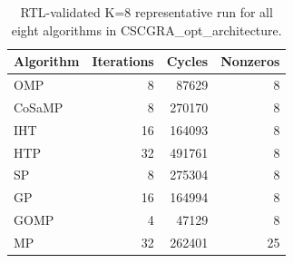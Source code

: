 \begin{table}[t]
\centering
\caption{RTL-validated K=8 representative run for all eight algorithms in CSCGRA\_opt\_architecture.}
\label{tab:k8_8alg_rtl_exact}
\begin{tabular}{lrrr}
\hline
Algorithm & Iterations & Cycles & Nonzeros \\ 
\hline
OMP & 8 & 87629 & 8 \\ 
CoSaMP & 8 & 270170 & 8 \\ 
IHT & 16 & 164093 & 8 \\ 
HTP & 32 & 491761 & 8 \\ 
SP & 8 & 275304 & 8 \\ 
GP & 16 & 164994 & 8 \\ 
GOMP & 4 & 47129 & 8 \\ 
MP & 32 & 262401 & 25 \\ 
\hline
\end{tabular}
\end{table}
